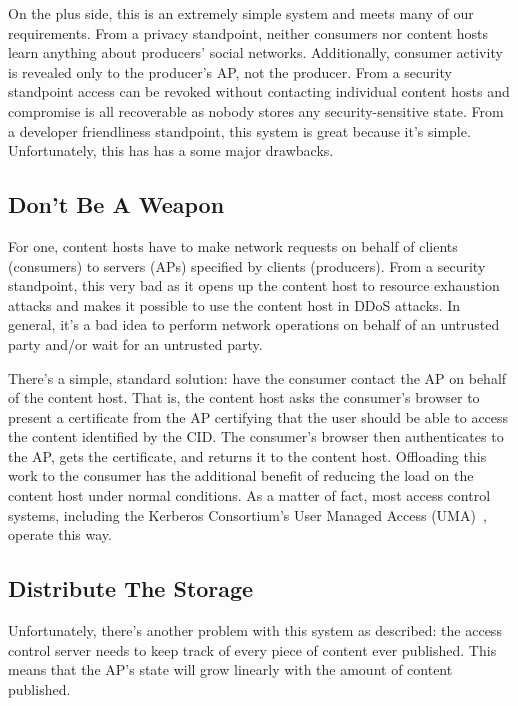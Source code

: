 \documentclass[pdftex,12pt,a4papaer,twoside,notitlepage]{report}
\begin{document}
On the plus side, this is an extremely simple system and meets many of our
requirements. From a privacy standpoint, neither consumers nor content hosts learn
anything about producers' social networks. Additionally, consumer activity is
revealed only to the producer's AP, not the producer. From a security standpoint
access can be revoked without contacting individual content hosts and compromise
is all recoverable as nobody stores any security-sensitive state. From a
developer friendliness standpoint, this system is great because it's simple.
Unfortunately, this has has a some major drawbacks.

\subsection{Don't Be A Weapon}

For one, content hosts have to make network requests on behalf of clients
(consumers) to servers (APs) specified by clients (producers). From a security
standpoint, this very bad as it opens up the content host to resource exhaustion
attacks and makes it possible to use the content host in DDoS attacks. In
general, it's a bad idea to perform network operations on behalf of an untrusted
party\cite{dns-amplification} and/or wait for an untrusted party\cite{slowloris}.

There's a simple, standard solution: have the consumer contact the AP on behalf
of the content host. That is, the content host asks the consumer's browser to
present a certificate from the AP certifying that the user should be able to
access the content identified by the CID. The consumer's browser then
authenticates to the AP, gets the certificate, and returns it to the content
host. Offloading this work to the consumer has the additional benefit of
reducing the load on the content host under normal conditions. As a matter of
fact, most access control systems, including the Kerberos Consortium's User
Managed Access (UMA)~\cite{uma}, operate this way.


\subsection{Distribute The Storage}

Unfortunately, there's another problem with this system as described: the access
control server needs to keep track of every piece of content ever published.
This means that the AP's state will grow linearly with the amount of content
published.
\end{document}
